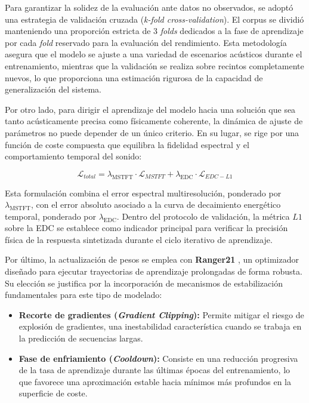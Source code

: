 Para garantizar la solidez de la evaluación ante datos no observados, se adoptó una estrategia de validación cruzada (\textit{k-fold cross-validation}). El corpus se dividió manteniendo una proporción estricta de 3 \textit{folds} dedicados a la fase de aprendizaje por cada \textit{fold} reservado para la evaluación del rendimiento. Esta metodología asegura que el modelo se ajuste a una variedad de escenarios acústicos durante el entrenamiento, mientras que la validación se realiza sobre recintos completamente nuevos, lo que proporciona una estimación rigurosa de la capacidad de generalización del sistema.

Por otro lado, para dirigir el aprendizaje del modelo hacia una solución que sea tanto acústicamente precisa como físicamente coherente, la dinámica de ajuste de parámetros no puede depender de un único criterio. En su lugar, se rige por una función de coste compuesta que equilibra la fidelidad espectral y el comportamiento temporal del sonido: 

\begin{equation}
\mathcal{L}_{total} = \lambda_{\mathrm{MSTFT}} \cdot \mathcal{L}_{MSTFT} + \lambda_{\mathrm{EDC}} \cdot \mathcal{L}_{EDC-L1}
\end{equation}

Esta formulación combina el error espectral multiresolución, ponderado por $\lambda_{\mathrm{MSTFT}}$, con el error absoluto asociado a la curva de decaimiento energético temporal, ponderado por $\lambda_{\mathrm{EDC}}$. Dentro del protocolo de validación, la métrica $L1$ sobre la EDC se establece como indicador principal para verificar la precisión física de la respuesta sintetizada durante el ciclo iterativo de aprendizaje.

Por último, la actualización de pesos se emplea con \textbf{Ranger21} \cite{Ranger21}, un optimizador diseñado para ejecutar trayectorias de aprendizaje prolongadas de forma robusta. Su elección se justifica por la incorporación de mecanismos de estabilización fundamentales para este tipo de modelado:
\begin{itemize}
    \item \textbf{Recorte de gradientes (\textit{Gradient Clipping}):} Permite mitigar el riesgo de explosión de gradientes, una inestabilidad característica cuando se trabaja en la predicción de secuencias largas.
    \item \textbf{Fase de enfriamiento (\textit{Cooldown}):} Consiste en una reducción progresiva de la tasa de aprendizaje durante las últimas épocas del entrenamiento, lo que favorece una aproximación estable hacia mínimos más profundos en la superficie de coste.
\end{itemize}


